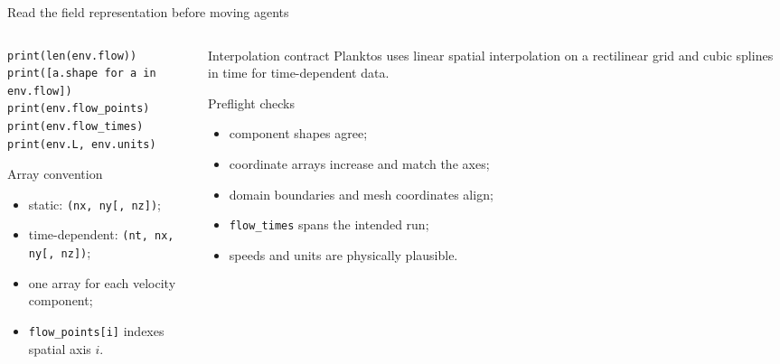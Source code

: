 \documentclass[aspectratio=169,11pt]{beamer}
\begin{document}
\begin{frame}[fragile]{Read the field representation before moving agents}
\small
\begin{columns}[T,onlytextwidth]
\begin{column}{0.54\textwidth}
\begin{lstlisting}
print(len(env.flow))
print([a.shape for a in env.flow])
print(env.flow_points)
print(env.flow_times)
print(env.L, env.units)
\end{lstlisting}
\begin{block}{Array convention}
\begin{itemize}\itemsep2pt
  \item static: \texttt{(nx, ny[, nz])};
  \item time-dependent: \texttt{(nt, nx, ny[, nz])};
  \item one array for each velocity component;
  \item \texttt{flow\_points[i]} indexes spatial axis \(i\).
\end{itemize}
\end{block}
\end{column}
\begin{column}{0.42\textwidth}
\begin{block}{Interpolation contract}
Planktos uses linear spatial interpolation on a rectilinear grid and cubic splines in time for time-dependent data.
\end{block}
\begin{alertblock}{Preflight checks}
{\footnotesize\begin{itemize}\itemsep0pt
  \item component shapes agree;
  \item coordinate arrays increase and match the axes;
  \item domain boundaries and mesh coordinates align;
  \item \texttt{flow\_times} spans the intended run;
  \item speeds and units are physically plausible.
\end{itemize}}
\end{alertblock}
\end{column}
\end{columns}
\end{frame}
\end{document}
